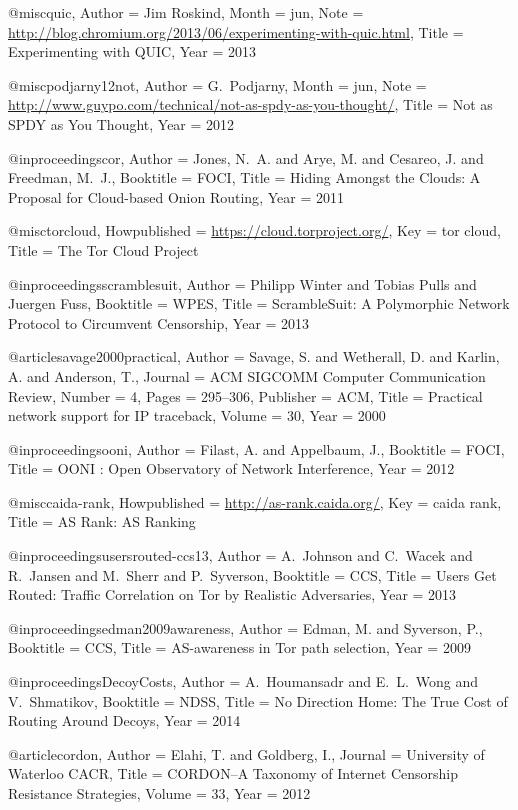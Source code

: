 {{{{{{{	@misc{quic,
	Author = {Jim Roskind},
	Month = jun,
	Note = {\url{http://blog.chromium.org/2013/06/experimenting-with-quic.html}},
	Title = {Experimenting with {QUIC}},
	Year = 2013}
	
	@misc{podjarny12not,
	Author = {G.~Podjarny},
	Month = jun,
	Note = {\url{http://www.guypo.com/technical/not-as-spdy-as-you-thought/}},
	Title = {{Not as SPDY as You Thought}},
	Year = 2012}
	
	@inproceedings{cor,
	Author = {Jones, N.~A. and Arye, M. and Cesareo, J. and Freedman, M.~J.},
	Booktitle = {FOCI},
	Title = {{Hiding Amongst the Clouds: A Proposal for Cloud-based Onion Routing}},
	Year = {2011}}
	
	@misc{torcloud,
	Howpublished = {\url{https://cloud.torproject.org/}},
	Key = {tor cloud},
	Title = {{The Tor Cloud Project}}}
	
	@inproceedings{scramblesuit,
	Author = {Philipp Winter and Tobias Pulls and Juergen Fuss},
	Booktitle = {WPES},
	Title = {{ScrambleSuit: A Polymorphic Network Protocol to Circumvent Censorship}},
	Year = 2013}
	
	@article{savage2000practical,
	Author = {Savage, S. and Wetherall, D. and Karlin, A. and Anderson, T.},
	Journal = {ACM SIGCOMM Computer Communication Review},
	Number = {4},
	Pages = {295--306},
	Publisher = {ACM},
	Title = {Practical network support for IP traceback},
	Volume = {30},
	Year = {2000}}
	
	@inproceedings{ooni,
	Author = {Filast, A. and Appelbaum, J.},
	Booktitle = {{FOCI}},
	Title = {{OONI : Open Observatory of Network Interference}},
	Year = {2012}}
	
	@misc{caida-rank,
	Howpublished = {\url{http://as-rank.caida.org/}},
	Key = {caida rank},
	Title = {{AS Rank: AS Ranking}}}
	
	@inproceedings{usersrouted-ccs13,
	Author = {A.~Johnson and C.~Wacek and R.~Jansen and M.~Sherr and P.~Syverson},
	Booktitle = {CCS},
	Title = {{Users Get Routed: Traffic Correlation on Tor by Realistic Adversaries}},
	Year = {2013}}
	
	@inproceedings{edman2009awareness,
	Author = {Edman, M. and Syverson, P.},
	Booktitle = {{CCS}},
	Title = {{AS-awareness in Tor path selection}},
	Year = {2009}}
	
	@inproceedings{DecoyCosts,
	Author = {A.~Houmansadr and E.~L.~Wong and V.~Shmatikov},
	Booktitle = {NDSS},
	Title = {{No Direction Home: The True Cost of Routing Around Decoys}},
	Year = {2014}}
	
	@article{cordon,
	Author = {Elahi, T. and Goldberg, I.},
	Journal = {University of Waterloo CACR},
	Title = {{CORDON--A Taxonomy of Internet Censorship Resistance Strategies}},
	Volume = {33},
	Year = {2012}}
	
}}}}}}}
